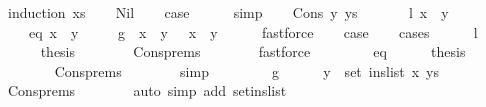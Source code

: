 \begin{isabellebody}
\isamarkupfalse%
\ {\isacharparenleft}{\kern0pt}induction\ xs{\isacharparenright}{\kern0pt}\isanewline
\ \ \isamarkupfalse%
\ Nil\isanewline
\ \ \isamarkupfalse%
\ {\isacharquery}{\kern0pt}case\isanewline
\ \ \ \ \isamarkupfalse%
\ simp\isanewline
{}\isamarkupfalse%
\isanewline
\ \ \isamarkupfalse%
\ {\isacharparenleft}{\kern0pt}Cons\ y\ ys{\isacharparenright}{\kern0pt}\isanewline
\ \ \isamarkupfalse%
\isanewline
\ \ \ \ {\isacharparenleft}{\kern0pt}l{\isacharparenright}{\kern0pt}\ {\isachardoublequoteopen}x\ {\isacharless}{\kern0pt}\ y{\isachardoublequoteclose}\ {\isacharbar}{\kern0pt}\isanewline
\ \ \ \ {\isacharparenleft}{\kern0pt}eq{\isacharparenright}{\kern0pt}\ {\isachardoublequoteopen}x\ {\isacharequal}{\kern0pt}\ y{\isachardoublequoteclose}\ {\isacharbar}{\kern0pt}\isanewline
\ \ \ \ {\isacharparenleft}{\kern0pt}g{\isacharparenright}{\kern0pt}\ {\isachardoublequoteopen}{\isasymnot}\ x\ {\isacharless}{\kern0pt}\ y\ {\isasymand}\ {\isasymnot}\ x\ {\isacharequal}{\kern0pt}\ y{\isachardoublequoteclose}\isanewline
\ \ \ \ \isamarkupfalse%
\ fastforce\isanewline
\ \ \isamarkupfalse%
\ {\isacharquery}{\kern0pt}case\isanewline
\ \ \isamarkupfalse%
\ {\isacharparenleft}{\kern0pt}cases{\isacharparenright}{\kern0pt}\isanewline
\ \ \ \ \isamarkupfalse%
\ l\isanewline
\ \ \ \ \isamarkupfalse%
\ {\isacharquery}{\kern0pt}thesis\isanewline
\ \ \ \ \ \ \isamarkupfalse%
\ Cons{\isachardot}{\kern0pt}prems\isanewline
\ \ \ \ \ \ \isamarkupfalse%
\ fastforce\isanewline
\ \ \isamarkupfalse%
\isanewline
\ \ \ \ \isamarkupfalse%
\ eq\isanewline
\ \ \ \ \isamarkupfalse%
\ {\isacharquery}{\kern0pt}thesis\isanewline
\ \ \ \ \ \ \isamarkupfalse%
\ Cons{\isachardot}{\kern0pt}prems\isanewline
\ \ \ \ \ \ \isamarkupfalse%
\ simp\isanewline
\ \ \isamarkupfalse%
\isanewline
\ \ \ \ \isamarkupfalse%
\ g\isanewline
\ \ \ \ \isamarkupfalse%
\ {\isachardoublequoteopen}y\ {\isasymnotin}\ set\ {\isacharparenleft}{\kern0pt}ins{\isacharunderscore}{\kern0pt}list\ x\ ys{\isacharparenright}{\kern0pt}{\isachardoublequoteclose}\isanewline
\ \ \ \ \ \ \isamarkupfalse%
\ Cons{\isachardot}{\kern0pt}prems\isanewline
\ \ \ \ \ \ \isamarkupfalse%
\ {\isacharparenleft}{\kern0pt}auto\ simp\ add{\isacharcolon}{\kern0pt}\ set{\isacharunderscore}{\kern0pt}ins{\isacharunderscore}{\kern0pt}list{\isacharparenright}{\kern0pt}\isanewline

\end{isabellebody}

